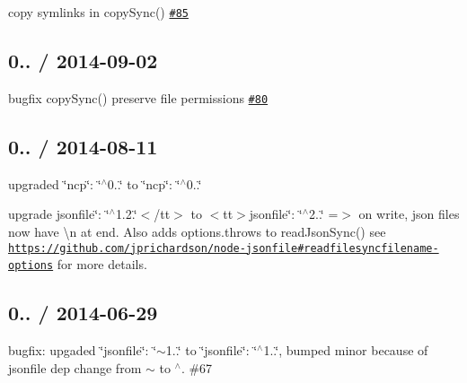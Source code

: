 \begin{DoxyItemize}
\item copy symlinks in {\ttfamily copy\+Sync()} \href{https://github.com/jprichardson/node-fs-extra/pull/85}{\tt \#85}
\end{DoxyItemize}

\subsection*{0.. / 2014-\/09-\/02 }


\begin{DoxyItemize}
\item bugfix {\ttfamily copy\+Sync()} preserve file permissions \href{https://github.com/jprichardson/node-fs-extra/pull/80}{\tt \#80}
\end{DoxyItemize}

\subsection*{0.. / 2014-\/08-\/11 }


\begin{DoxyItemize}
\item upgraded {\ttfamily \char`\"{}ncp\char`\"{}\+: \char`\"{}$^\wedge$0..\char`\"{}} to {\ttfamily \char`\"{}ncp\char`\"{}\+: \char`\"{}$^\wedge$0..\char`\"{}}
\item upgrade {\ttfamily jsonfile\char`\"{}\+: \char`\"{}$^\wedge$1.2.\char`\"{}$<$/tt$>$ to $<$tt$>$jsonfile\char`\"{}\+: \char`\"{}$^\wedge$2..\char`\"{}} =$>$ on write, json files now have {\ttfamily \textbackslash{}n} at end. Also adds {\ttfamily options.\+throws} to {\ttfamily read\+Json\+Sync()} see \href{https://github.com/jprichardson/node-jsonfile#readfilesyncfilename-options}{\tt https\+://github.\+com/jprichardson/node-\/jsonfile\#readfilesyncfilename-\/options} for more details.
\end{DoxyItemize}

\subsection*{0.. / 2014-\/06-\/29 }


\begin{DoxyItemize}
\item bugfix\+: upgaded {\ttfamily \char`\"{}jsonfile\char`\"{}\+: \char`\"{}$\sim$1..\char`\"{}} to {\ttfamily \char`\"{}jsonfile\char`\"{}\+: \char`\"{}$^\wedge$1..\char`\"{}}, bumped minor because of {\ttfamily jsonfile} dep change from {\ttfamily $\sim$} to {\ttfamily $^\wedge$}. \#67
\end{DoxyItemize}

